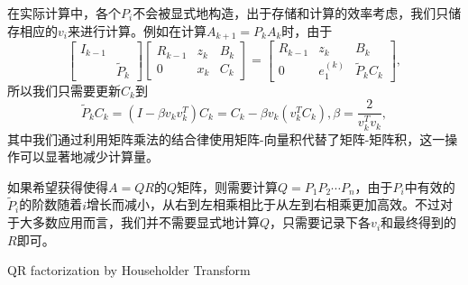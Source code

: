 \documentclass[a4paper,10pt]{ctexart}
\begin{document}
在实际计算中，各个$ P_i $不会被显式地构造，出于存储和计算的效率考虑，我们只储存相应的$ v_i $来进行计算。例如在计算$ A_{k+1} = P_k A_k $时，由于
\[
    \begin{bmatrix} 
        I_{k-1} & \\
        & \tilde{P}_k
    \end{bmatrix}
    \begin{bmatrix}
         R_{k-1} & z_k & B_k\\
         0 & x_k & C_k
    \end{bmatrix} =
    \begin{bmatrix}
        R_{k-1} & z_k & B_k\\
        0 & e_1^{(k)} & \tilde{P}_k C_k
    \end{bmatrix},
\]
所以我们只需要更新$ C_k $到
\[
    \tilde{P}_k C_k = (I - \beta v_k v_k^T)C_k = C_k - \beta v_k(v^T_k C_k), \beta = \frac{2}{v^T_kv_k},
\]
其中我们通过利用矩阵乘法的结合律使用矩阵-向量积代替了矩阵-矩阵积，这一操作可以显著地减少计算量。

如果希望获得使得$ A=QR $的$ Q $矩阵，则需要计算$ Q = P_1 P_2\cdots P_n $，由于$ P_i $中有效的$ \tilde{P}_i $的阶数随着$ i $增长而减小，从右到左相乘相比于从左到右相乘更加高效。不过对于大多数应用而言，我们并不需要显式地计算$ Q $，只需要记录下各$ v_i $和最终得到的$ R $即可。

\begin{algorithm}[htbp]
    \caption{QR factorization by Householder Transform}\label{alg:HouseholderQR}
    \;
\end{algorithm}
\end{document}
